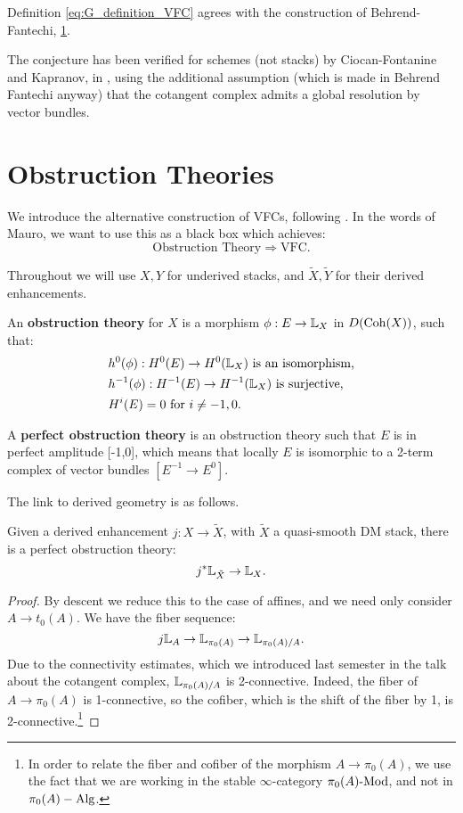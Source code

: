 \begin{conj}
Definition \ref{eq:G_definition_VFC} agrees with the construction of Behrend-Fantechi, \ref{}. 
\end{conj}

The conjecture has been verified for schemes (not stacks) by Ciocan-Fontanine and Kapranov, in
\cite{ciocan_fontanine_kapranov}, using the additional 
assumption (which is made in Behrend Fantechi anyway) that the cotangent complex admits a global resolution by vector bundles.




\section{Obstruction Theories}
We introduce the alternative construction of VFCs, following \cite{Behrend_Intrinsic_normal_cone_1997}. In the words of
Mauro, we want to use this as a black box which achieves:
\[	\text{Obstruction Theory} \Longrightarrow \text{VFC}.	\]

Throughout we will use $X,Y$ for underived stacks, and $\tilde X, \tilde Y$ for their derived enhancements.

\begin{defin}
An \textbf{obstruction theory} for $X$ is a morphism $\phi : E \to \mathbb L_X$ in $D(\mathrm{Coh}(X))$, such that:
\begin{align*}
&h^0(\phi) : H^0(E) \to H^0(\mathbb L_X) \text{ is an isomorphism,} \\
&h^{-1}(\phi) : H^{-1}(E) \to H^{-1}(\mathbb L_X) \text{ is surjective,} \\
&H^i(E) = 0 \text{ for } i \neq -1,0.
\end{align*} 
\end{defin}

\begin{defin}
A \textbf{perfect obstruction theory} is an obstruction theory such that $E$ is in perfect amplitude [-1,0], which means that
locally $E$ is isomorphic to a 2-term complex of vector bundles $[E^{-1} \to E^0]$.
\end{defin}

The link to derived geometry is as follows. 
\begin{prop}
\label{prop:derived_obstruction_theory}
Given a derived enhancement $j:X \to \tilde X$, with $\tilde X$ a quasi-smooth DM stack, there is a perfect obstruction theory:
\[	j^* \mathbb L_{\tilde X} \to \mathbb L_X.	\]
\end{prop}
\begin{proof}
By descent we reduce this to the case of affines, and we need only consider $A \to t_0(A)$. We have the fiber sequence:
\[	j\mathbb L_A \to \mathbb L_{\pi_0(A)} \to \mathbb L_{\pi_0(A)/A}.	\]
Due to the connectivity estimates, which we introduced last semester in the talk about the cotangent complex,
$\mathbb L_{\pi_0(A)/A}$ is 2-connective. Indeed, the fiber of $A \to \pi_0(A)$ is 1-connective,
so the cofiber, which is the shift of the fiber by 1, is 2-connective.\footnote{In order to relate the fiber and cofiber of the
morphism $A \to \pi_0(A)$, we use the fact that we are working in the stable $\infty$-category $\pi_0(A)\textrm{-}\mathrm{Mod}$, and not 
in $\pi_0(A)-\operatorname{Alg}$.}
\end{proof}

